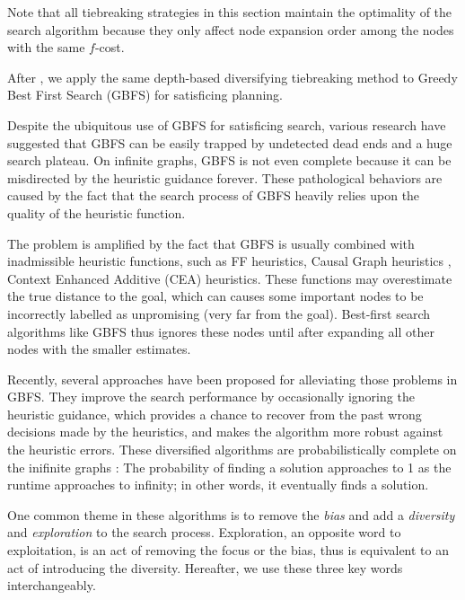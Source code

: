 Note that all tiebreaking strategies in this section maintain the
optimality of the search algorithm because they only affect node
expansion order among the nodes with the same $f$-cost.


After , we apply the same depth-based diversifying tiebreaking
method to Greedy Best First Search (GBFS) for satisficing planning.

Despite the ubiquitous use of GBFS for satisficing search,
various research have suggested that GBFS can be
easily trapped by undetected dead ends and a huge search plateau.
On infinite graphs, GBFS is not even complete \cite{Valenzano2016}
because it can be misdirected by the heuristic guidance forever.
These pathological behaviors are caused by the fact that 
the search process of GBFS heavily relies upon the
quality of the heuristic function.

The problem is amplified by the fact that GBFS is usually combined
with inadmissible heuristic functions, such as FF
heuristics\cite{Hoffmann01}, Causal Graph heuristics \cite{Helmert2006}, Context Enhanced
Additive (CEA) heuristics\cite{helmert2008unifying}.
These functions may overestimate the true distance to the goal,
which can causes some important nodes to be incorrectly labelled as unpromising
(very far from the goal). Best-first search algorithms like GBFS thus
ignores these nodes until after expanding all other nodes with the smaller estimates.

Recently, several approaches
\cite{imai2011novel,valenzano2014comparison,xie14type} have been
proposed for alleviating those problems in GBFS. They improve the search
performance by occasionally ignoring the heuristic guidance, which
provides a chance to recover from the past wrong decisions made by the
heuristics, and makes the algorithm more robust against the heuristic
errors.  These diversified algorithms are probabilistically complete on
the inifinite graphs \cite{Valenzano2016}: The probability of finding a
solution approaches to 1 as the runtime approaches to infinity; in other
words, it eventually finds a solution.


One common theme in these algorithms is to remove the \emph{bias} and
add a \emph{diversity} and \emph{exploration} to the search process.
Exploration, an opposite word to exploitation, is an act of removing
the focus or the bias, thus is equivalent to an act of introducing the
diversity. Hereafter, we use these three key words interchangeably.

